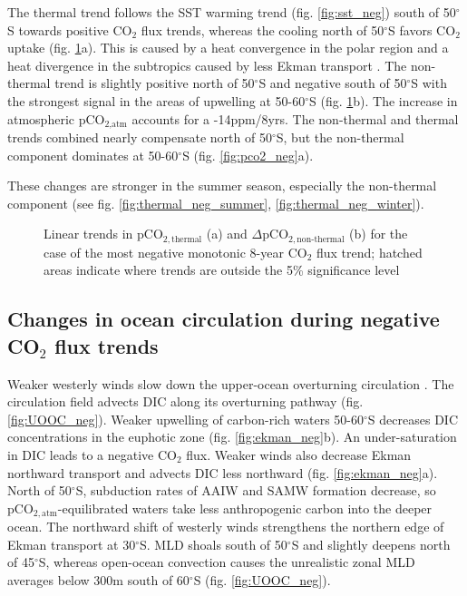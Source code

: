 The thermal trend follows the \ac{SST} warming trend (fig. \ref{fig:sst_neg}) south of 50$^\circ$S towards positive CO$_2$ flux trends, whereas the cooling north of 50$^\circ$S favors CO$_2$ uptake (fig. \ref{fig:thermal_neg}a). This is caused by a heat convergence in the polar region and a heat divergence in the subtropics caused by less Ekman transport \citep{Hall2002}. The non-thermal trend is slightly positive north of 50$^\circ$S and negative south of 50$^\circ$S with the strongest signal in the areas of upwelling at 50-60$^\circ$S (fig. \ref{fig:thermal_neg}b). The increase in atmospheric pCO$_{\text{2,atm}}$ accounts for a -14ppm/8yrs. The non-thermal and thermal trends combined nearly compensate  north of 50$^\circ$S, but the non-thermal component dominates at 50-60$^\circ$S (fig. \ref{fig:pco2_neg}a). 

These changes are stronger in the summer season, especially the non-thermal component (see fig. \ref{fig:thermal_neg_summer}, \ref{fig:thermal_neg_winter}). 

\begin{figure}[h!]
	\caption{Linear trends in pCO$_{2,\text{thermal}}$ (a) and $\Delta$pCO$_{2,\text{non-thermal}}$ (b) for the case of the most negative monotonic 8-year CO$_2$ flux trend; hatched areas indicate where trends are outside the 5\% significance level}
	\label{fig:thermal_neg}
\end{figure}
 





\clearpage

\subsection{Changes in ocean circulation during negative CO$_2$ flux trends}
\label{sec:trends_neg_circulation}

Weaker westerly winds slow down the upper-ocean overturning circulation \citep{Lauderdale2013}. The circulation field advects \acs{DIC} along its overturning pathway (fig. \ref{fig:UOOC_neg}). Weaker upwelling of carbon-rich waters 50-60$^\circ$S decreases \acs{DIC} concentrations in the euphotic zone (fig. \ref{fig:ekman_neg}b). An under-saturation in \acs{DIC} leads to a negative CO$_2$ flux. Weaker winds also decrease Ekman northward transport and advects \acs{DIC} less northward (fig. \ref{fig:ekman_neg}a). North of 50$^\circ$S, subduction rates of \acs{AAIW} and \acs{SAMW} formation decrease, so pCO$_{2,\text{atm}}$-equilibrated waters take less anthropogenic carbon into the deeper ocean. The northward shift of westerly winds strengthens the northern edge of Ekman transport at 30$^\circ$S. \acs{MLD} shoals south of 50$^\circ$S and slightly deepens north of 45$^\circ$S, whereas open-ocean convection causes the unrealistic zonal \acs{MLD} averages below 300m south of 60$^\circ$S  (fig. \ref{fig:UOOC_neg}). 


